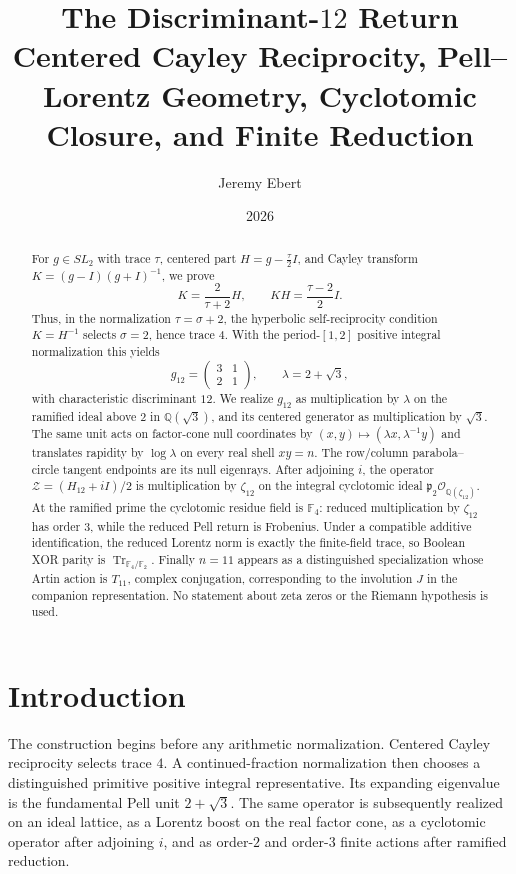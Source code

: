 \documentclass[11pt]{article}
\title{\textbf{The Discriminant-$12$ Return}\\
\large Centered Cayley Reciprocity, Pell--Lorentz Geometry, Cyclotomic Closure, and Finite Reduction}
\author{Jeremy Ebert}
\date{2026}
\theoremstyle{remark}
\newcommand{\Q}{\mathbb Q}
\newcommand{\F}{\mathbb F}
\newcommand{\OO}{\mathcal O}
\newcommand{\Tr}{\operatorname{Tr}}
\begin{document}
\maketitle

\begin{abstract}
For $g\in SL_2$ with trace $\tau$, centered part
$H=g-\tfrac{\tau}{2}I$, and Cayley transform
$K=(g-I)(g+I)^{-1}$, we prove
\[
K=\frac{2}{\tau+2}H,
\qquad
KH=\frac{\tau-2}{2}I.
\]
Thus, in the normalization $\tau=\sigma+2$, the hyperbolic self-reciprocity
condition $K=H^{-1}$ selects $\sigma=2$, hence trace $4$.  With the
period-$[1,2]$ positive integral normalization this yields
\[
g_{12}=\begin{pmatrix}3&1\\2&1\end{pmatrix},
\qquad
\lambda=2+\sqrt3,
\]
with characteristic discriminant $12$.  We realize $g_{12}$ as multiplication
by $\lambda$ on the ramified ideal above $2$ in $\Q(\sqrt3)$, and its centered
generator as multiplication by $\sqrt3$.  The same unit acts on factor-cone
null coordinates by $(x,y)\mapsto(\lambda x,\lambda^{-1}y)$ and translates
rapidity by $\log\lambda$ on every real shell $xy=n$.  The row/column
parabola--circle tangent endpoints are its null eigenrays.  After adjoining
$i$, the operator $\mathcal Z=(H_{12}+iI)/2$ is multiplication by
$\zeta_{12}$ on the integral cyclotomic ideal
$\mathfrak p_2\OO_{\Q(\zeta_{12})}$.  At the ramified prime the cyclotomic
residue field is $\F_4$: reduced multiplication by $\zeta_{12}$ has order
$3$, while the reduced Pell return is Frobenius.  Under a compatible additive
identification, the reduced Lorentz norm is exactly the finite-field trace,
so Boolean XOR parity is $\Tr_{\F_4/\F_2}$.  Finally $n=11$ appears as a
distinguished specialization whose Artin action is $T_{11}$, complex
conjugation, corresponding to the involution $J$ in the companion
representation.  No statement about zeta zeros or the Riemann hypothesis is
used.
\end{abstract}

\section{Introduction}

The construction begins before any arithmetic normalization.  Centered Cayley
reciprocity selects trace $4$.  A continued-fraction normalization then
chooses a distinguished primitive positive integral representative.  Its
expanding eigenvalue is the fundamental Pell unit $2+\sqrt3$.  The same
operator is subsequently realized on an ideal lattice, as a Lorentz boost on
the real factor cone, as a cyclotomic operator after adjoining $i$, and as
order-$2$ and order-$3$ finite actions after ramified reduction.
\end{document}
